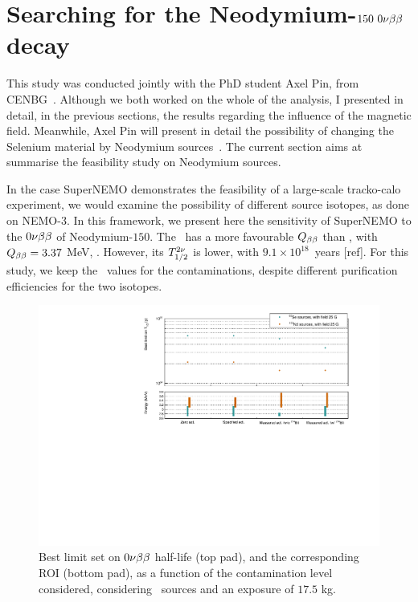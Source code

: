 \section{Searching for the Neodymium-$150~0\nu\beta\beta$ decay}
\label{sec:Nd}

This study was conducted jointly with the PhD student Axel Pin, from CENBG~\cite{}.
Although we both worked on the whole of the analysis, I presented in detail, in the previous sections, the results regarding the influence of the magnetic field.
Meanwhile, Axel Pin will present in detail the possibility of changing the Selenium material by Neodymium sources~\cite{AxelThesis}.
The current section aims at summarise the feasibility study on Neodymium sources.

In the case SuperNEMO demonstrates the feasibility of a large-scale tracko-calo experiment, we would examine the possibility of different source isotopes, as done on NEMO-$3$.
In this framework, we present here the sensitivity of SuperNEMO to the $0\nu\beta\beta$ of Neodymium-$150$.
The \Nd\ has a more favourable $Q_{\beta\beta}$ than \Se, with $Q_{\beta\beta} = 3.37$ MeV, .
However, its $T_{1/2}^{2\nu}$ is lower, with $9.1\times 10^{18}$~years [ref].
For this study, we keep the \Se\ values for the contaminations, despite different purification efficiencies for the two isotopes.

\begin{figure}[h]
  \centering
  \includegraphics[width=1.1\textwidth]{Sensitivity/fig_sensitivity/contamination_level_isotope.pdf}
  \caption{Best limit set on $0\nu\beta\beta$ half-life (top pad), and the corresponding ROI (bottom pad), as a function of the contamination level considered, considering \Nd\ sources and an exposure of $17.5$ kg.
    \label{fig:sensitivity_nd}}
\end{figure}

